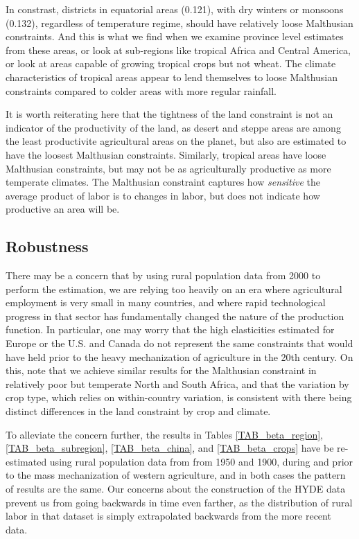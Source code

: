 \documentclass[11pt]{article}
\begin{document}
In constrast, districts in equatorial areas (0.121), with dry winters or monsoons (0.132), regardless of temperature regime, should have relatively loose Malthusian constraints. And this is what we find when we examine province level estimates from these areas, or look at sub-regions like tropical Africa and Central America, or look at areas capable of growing tropical crops but not wheat. The climate characteristics of tropical areas appear to lend themselves to loose Malthusian constraints compared to colder areas with more regular rainfall. 

It is worth reiterating here that the tightness of the land constraint is not an indicator of the productivity of the land, as desert and steppe areas are among the least productivite agricultural areas on the planet, but also are estimated to have the loosest Malthusian constraints. Similarly, tropical areas have loose Malthusian constraints, but may not be as agriculturally productive as more temperate climates. The Malthusian constraint captures how \textit{sensitive} the average product of labor is to changes in labor, but does not indicate how productive an area will be.

\subsection{Robustness}
There may be a concern that by using rural population data from 2000 to perform the estimation, we are relying too heavily on an era where agricultural employment is very small in many countries, and where rapid technological progress in that sector has fundamentally changed the nature of the production function. In particular, one may worry that the high elasticities estimated for Europe or the U.S. and Canada do not represent the same constraints that would have held prior to the heavy mechanization of agriculture in the 20th century. On this, note that we achieve similar results for the Malthusian constraint in relatively poor but temperate North and South Africa, and that the variation by crop type, which relies on within-country variation, is consistent with there being distinct differences in the land constraint by crop and climate. 

To alleviate the concern further, the results in Tables \ref{TAB_beta_region}, \ref{TAB_beta_subregion}, \ref{TAB_beta_china}, and \ref{TAB_beta_crops} have be re-estimated using rural population data from \citet{hyde31} from 1950 and 1900, during and prior to the mass mechanization of western agriculture, and in both cases the pattern of results are the same. Our concerns about the construction of the HYDE data prevent us from going backwards in time even farther, as the distribution of rural labor in that dataset is simply extrapolated backwards from the more recent data.
\end{document}
